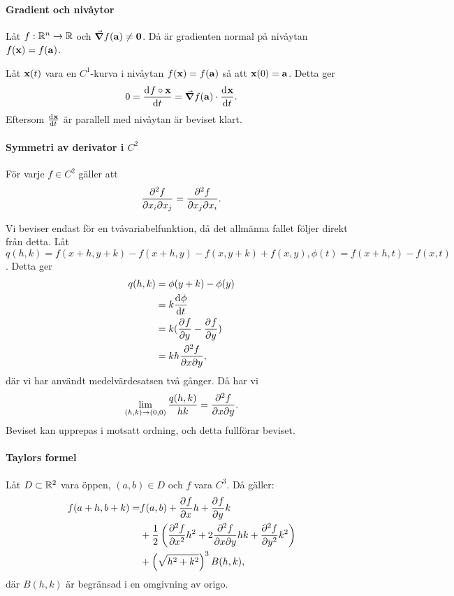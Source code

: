 \paragraph{Gradient och nivåytor}
Låt $f: \mathbb{R}^n\to\mathbb{R}$ och $\grad{f}(\vect{a})\neq\vect{0}$. Då är gradienten normal på nivåytan $f(\vect{x}) = f(\vect{a})$.

\proof
Låt $\vect{x}(t)$ vara en $C^1$-kurva i nivåytan $f(\vect{x}) = f(\vect{a})$ så att $\vect{x}(0) = \vect{a}$. Detta ger
\begin{align*}
	0 = \deval{f\circ \vect{x}}{t}{0} = \grad{f}(\vect{a})\cdot\deval{\vect{x}}{t}{0}.
\end{align*}
Eftersom $\deval{\vect{x}}{t}{0}$ är parallell med nivåytan är beviset klart.

\paragraph{Symmetri av derivator i $C^2$}
För varje $f\in C^2$ gäller att
\begin{align*}
	\pdv{f}{x_i}{x_j} = \pdv{f}{x_j}{x_i}.
\end{align*}

\proof
Vi beviser endast för en tvåvariabelfunktion, då det allmänna fallet följer direkt från detta. Låt $q(h, k) = f(x + h, y + k) - f(x + h, y) - f(x, y + k) + f(x, y), \phi(t) = f(x + h, t) - f(x, t)$. Detta ger
\begin{align*}
	q(h, k) &= \phi(y + k) - \phi(y) \\
	        &= k\dv[]{\phi}{t} (y + \theta k) \\
	        &= k(\pdv[]{f}{y} (x + h, y + \theta k) - \pdv[]{f}{y} (x, y + \theta k)) \\
	        &= kh\pdv{f}{x}{y} (x + \eta h, y + \theta k),
\end{align*}
där vi har användt medelvärdesatsen två gånger. Då har vi
\begin{align*}
	\lim\limits_{(h, k)\to (0, 0)}\frac{q(h, k)}{hk} = \pdv{f}{x}{y} (x, y).
\end{align*}
Beviset kan upprepas i motsatt ordning, och detta fullförar beviset.

\paragraph{Taylors formel}
Låt $D\subset\mathbb{R}^2$ vara öppen, $(a, b)\in D$ och $f$ vara $C^3$. Då gäller:
\begin{align*}
	f(a + h, b + k) =& f(a, b) + \pdv[]{f}{x} (a, b)h + \pdv[]{f}{y} (a, b)k \\
	                 &+ \frac{1}{2}\left(\pdv[2]{f}{x} (a, b)h^2 + 2\pdv{f}{x}{y} (a, b)hk + \pdv[2]{f}{y} (a, b)k^2\right) \\
	                 &+ \left(\sqrt{h^2 + k^2}\right)^3B(h, k),
\end{align*}
där $B(h, k)$ är begränsad i en omgivning av origo.

